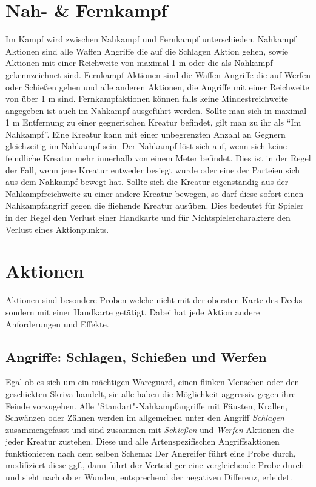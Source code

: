 \section{Nah- \& Fernkampf}
Im Kampf wird zwischen Nahkampf und Fernkampf unterschieden.
Nahkampf Aktionen sind alle Waffen Angriffe die auf die Schlagen Aktion gehen, sowie Aktionen mit einer Reichweite von maximal 1 m oder die als Nahkampf gekennzeichnet sind. Fernkampf Aktionen sind die Waffen Angriffe die auf Werfen oder Schießen gehen und alle anderen Aktionen, die Angriffe mit einer Reichweite von über 1 m sind. Fernkampfaktionen können falls keine Mindestreichweite angegeben ist auch  im Nahkampf ausgeführt werden.
Sollte man sich in maximal 1 m Entfernung zu einer gegnerischen Kreatur befindet, gilt man zu ihr als “Im Nahkampf”. Eine Kreatur kann mit einer unbegrenzten Anzahl an Gegnern gleichzeitig im Nahkampf sein. Der Nahkampf löst sich auf, wenn sich keine feindliche Kreatur mehr innerhalb von einem Meter befindet. Dies ist in der Regel der Fall, wenn jene Kreatur entweder besiegt wurde oder eine der Parteien sich aus dem Nahkampf bewegt hat. Sollte sich die Kreatur eigenständig aus der Nahkampfreichweite zu einer andere Kreatur bewegen, so darf diese sofort einen Nahkampfangriff gegen die fliehende Kreatur ausüben. Dies bedeutet für Spieler in der Regel den Verlust einer Handkarte und für Nichtspielercharaktere den Verlust eines Aktionpunkts. 

\section{Aktionen}
Aktionen sind besondere Proben welche nicht mit der obersten Karte des Decks sondern mit einer Handkarte getätigt. Dabei hat jede Aktion andere Anforderungen und Effekte.

\subsection*{Angriffe: Schlagen, Schießen und Werfen}
Egal ob es sich um ein mächtigen Wareguard, einen flinken Menschen oder den geschickten Skriva handelt, sie alle haben die Möglichkeit aggressiv gegen ihre  Feinde vorzugehen. Alle "Standart"-Nahkampfangriffe mit Fäusten, Krallen, Schwänzen oder Zähnen werden im allgemeinen unter den Angriff \textit{Schlagen} zusammengefasst und sind zusammen mit \textit{Schießen} und \textit{Werfen} Aktionen die jeder Kreatur zustehen. Diese und alle Artenspezifischen Angriffsaktionen funktionieren nach dem selben Schema: Der Angreifer führt eine Probe durch, modifiziert diese ggf., dann führt der Verteidiger eine vergleichende Probe durch und sieht nach ob er Wunden, entsprechend der negativen Differenz, erleidet.

